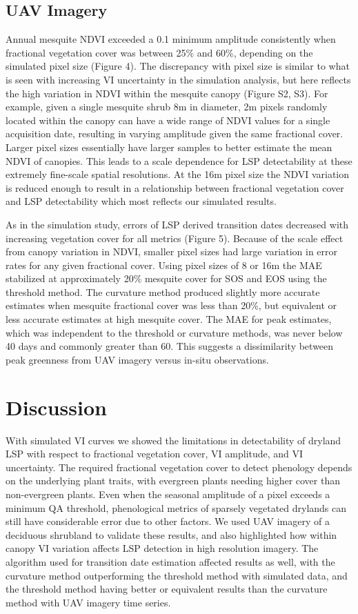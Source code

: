 \documentclass{article}
\begin{document}
\subsection{UAV Imagery}

Annual mesquite NDVI exceeded a 0.1 minimum amplitude consistently when fractional vegetation cover was between 25\% and 60\%, depending on the simulated pixel size (Figure 4). The discrepancy with pixel size is similar to what is seen with increasing VI uncertainty in the simulation analysis, but here reflects the high variation in NDVI within the mesquite canopy (Figure S2, S3). For example, given a single mesquite shrub 8m in diameter, 2m pixels randomly located within the canopy can have a wide range of NDVI values for a single acquisition date, resulting in varying amplitude given the same fractional cover. Larger pixel sizes essentially have larger samples to better estimate the mean NDVI of canopies. This leads to a scale dependence for LSP detectability at these extremely fine-scale spatial resolutions. At the 16m pixel size the NDVI variation is reduced enough to result in a relationship between fractional vegetation cover and LSP detectability which most reflects our simulated results.

As in the simulation study, errors of LSP derived transition dates decreased with increasing vegetation cover for all metrics (Figure 5). Because of the scale effect from canopy variation in NDVI, smaller pixel sizes had large variation in error rates for any given fractional cover. Using pixel sizes of 8 or 16m the MAE stabilized at approximately 20\% mesquite cover for SOS and EOS using the threshold method. The curvature method produced slightly more accurate estimates when mesquite fractional cover was less than 20\%, but equivalent or less accurate estimates at high mesquite cover. The MAE for peak estimates, which was independent to the threshold or curvature methods, was never below 40 days and commonly greater than 60. This suggests a dissimilarity between peak greenness from UAV imagery versus in-situ observations.


\section{Discussion}

With simulated VI curves we showed the limitations in detectability of dryland LSP with respect to fractional vegetation cover, VI amplitude, and VI uncertainty. The required fractional vegetation cover to detect phenology depends on the underlying plant traits, with evergreen plants needing higher cover than non-evergreen plants. Even when the seasonal amplitude of a pixel exceeds a minimum QA threshold, phenological metrics of sparsely vegetated drylands can still have considerable error due to other factors.  We used UAV imagery of a deciduous shrubland to validate these results, and also highlighted how within canopy VI variation affects LSP detection in high resolution imagery. The algorithm used for transition date estimation affected results as well, with the curvature method outperforming the threshold method with simulated data, and the threshold method having better or equivalent results than the curvature method with UAV imagery time series. 
\end{document}
